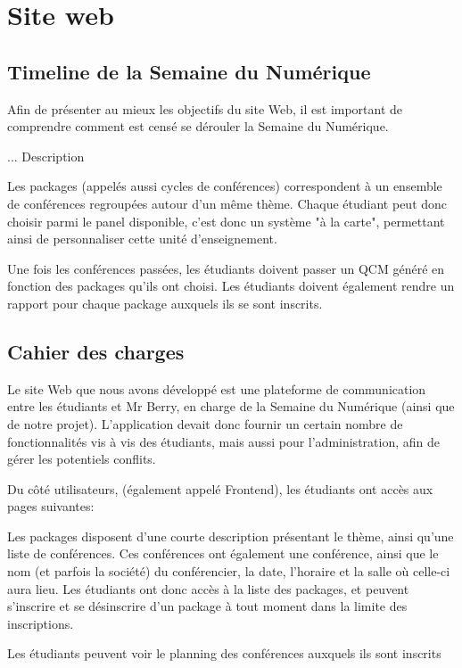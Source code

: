 \chapter{Site web}
    \section{Timeline de la Semaine du Numérique}

    Afin de présenter au mieux les objectifs du site Web, il est important de comprendre comment
    est censé se dérouler la Semaine du Numérique.

    ... Description

    Les packages (appelés aussi cycles de conférences) correspondent à un ensemble de conférences regroupées autour d'un même thème.
    Chaque étudiant peut donc choisir parmi le panel disponible, c'est donc un système "à la carte", permettant
    ainsi de personnaliser cette unité d'enseignement.

    Une fois les conférences passées, les étudiants doivent passer un QCM généré en fonction des packages qu'ils ont choisi.
    Les étudiants doivent également rendre un rapport pour chaque package auxquels ils se sont inscrits.

    \section{Cahier des charges}
    Le site Web que nous avons développé est une plateforme de communication entre les étudiants
    et Mr Berry, en charge de la Semaine du Numérique (ainsi que de notre projet).
    L'application devait donc fournir un certain nombre de fonctionnalités vis à vis des étudiants,
    mais aussi pour l'administration, afin de gérer les potentiels conflits.

    Du côté utilisateurs, (également appelé Frontend), les étudiants ont accès aux pages suivantes:

    Les packages disposent d'une courte description présentant le thème, ainsi qu'une liste de conférences.
    Ces conférences ont également une conférence, ainsi que le nom (et parfois la société) du conférencier,
    la date, l'horaire et la salle où celle-ci aura lieu.
    Les étudiants ont donc accès à la liste des packages, et peuvent s'inscrire et se désinscrire
    d'un package à tout moment dans la limite des inscriptions.

    Les étudiants peuvent voir le planning des conférences auxquels ils sont inscrits

